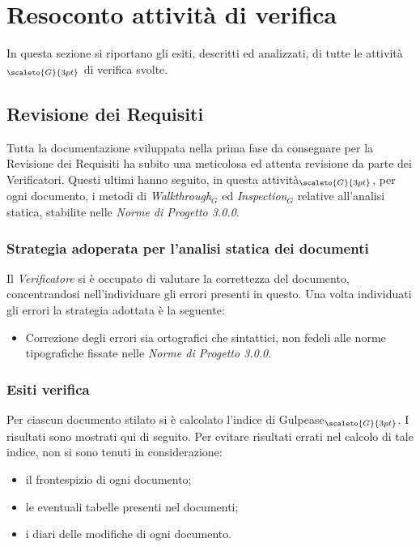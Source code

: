 \chapter{Resoconto attività di verifica } \label{ResocontoAttivitàDiVerifica}
In questa sezione si riportano gli esiti, descritti ed analizzati, di tutte le attività$_{\scaleto{G}{3pt}}$ di verifica svolte.
\section{Revisione dei Requisiti}  \label{ResocontoAttivitàDiVerificaRevisioneDeiRequisiti}
Tutta la documentazione sviluppata nella prima fase da consegnare per la Revisione dei Requisiti ha subito una meticolosa ed attenta revisione da parte dei Verificatori. Questi ultimi hanno seguito, in questa attività$_{\scaleto{G}{3pt}}$, per ogni documento, i metodi di \textit{Walkthrough$_G$} ed \textit{Inspection$_G$} relative all’analisi statica, stabilite nelle \textit{Norme di Progetto 3.0.0}.
\subsection{Strategia adoperata per l’analisi statica dei documenti} \label{ResocontoAttivitàDiVerificaRevisioneDeiRequisitiStrategiaPerAnalisiStatica}
Il \textit{Verificatore} si è occupato di valutare la correttezza del documento, concentrandosi nell’individuare gli errori presenti in questo. Una volta individuati gli errori la strategia adottata è la seguente:
\begin{itemize}
	\item Correzione degli errori sia ortografici che sintattici, non fedeli alle norme tipografiche fissate nelle \textit{Norme di Progetto 3.0.0}.
\end{itemize}

\subsection{Esiti verifica} \label{ResocontoAttivitàDiVerificaRevisioneDeiRequisitiEsitiVerifica}
Per ciascun documento stilato si è calcolato l’indice di Gulpease$_{\scaleto{G}{3pt}}$. I risultati sono mostrati qui di seguito.
Per evitare risultati errati nel calcolo di tale indice, non si sono tenuti in considerazione:
\begin{itemize}
	\item il frontespizio di ogni documento;
	\item le eventuali tabelle presenti nel documenti;
	\item i diari delle modifiche di ogni documento.
\end{itemize}


